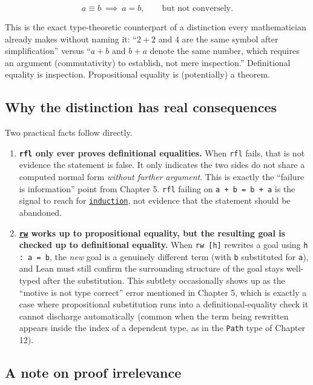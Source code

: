 \[
a \equiv b \ \implies\ a = b, \qquad\text{but not conversely.}
\]

This is the exact type-theoretic counterpart of a distinction every mathematician already makes without naming it: ``\(2+2\) and \(4\) are the same symbol after simplification'' versus ``\(a+b\) and \(b+a\) denote the same number, which requires an argument (commutativity) to establish, not mere inspection.'' Definitional equality is inspection. Propositional equality is (potentially) a theorem.

\subsection{Why the distinction has real consequences}\label{sec:06-rigor-check:04-defeq-vs-propeq:4}

Two practical facts follow directly.

\begin{enumerate}
\def\labelenumi{\arabic{enumi}.}
\tightlist
\item
  \textbf{\texttt{rfl} only ever proves definitional equalities.} When \texttt{rfl} fails, that is not evidence the statement is false. It only indicates the two sides do not share a computed normal form \emph{without further argument}. This is exactly the ``failure is information'' point from Chapter 5. \texttt{rfl} failing on \texttt{a + b = b + a} is the signal to reach for \href{https://lean-lang.org/doc/reference/latest/Tactic-Proofs/Tactic-Reference/}{\texttt{induction}}, not evidence that the statement should be abandoned.
\item
  \textbf{\href{https://lean-lang.org/doc/reference/latest/Tactic-Proofs/Tactic-Reference/}{\texttt{rw}} works up to propositional equality, but the resulting goal is checked up to definitional equality.} When \texttt{rw [h]} rewrites a goal using \texttt{h : a = b}, the \emph{new} goal is a genuinely different term (with \texttt{b} substituted for \texttt{a}), and Lean must still confirm the surrounding structure of the goal stays well-typed after the substitution. This subtlety occasionally shows up as the ``motive is not type correct'' error mentioned in Chapter 5, which is exactly a case where propositional substitution runs into a definitional-equality check it cannot discharge automatically (common when the term being rewritten appears inside the index of a dependent type, as in the \texttt{Path} type of Chapter 12).
\end{enumerate}

\subsection{A note on proof irrelevance}\label{sec:06-rigor-check:04-defeq-vs-propeq:5}

